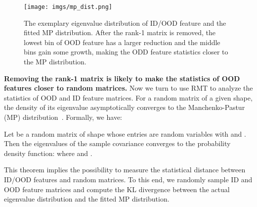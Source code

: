 \begin{figure}[htbp]
    \centering
    \texttt{[image: imgs/mp\_dist.png]}
    \caption{The exemplary eigenvalue distribution of ID/OOD feature and the fitted MP distribution. After the rank-1 matrix is removed, the lowest bin of OOD feature has a larger reduction and the middle bins gain some growth, making the ODD feature statistics closer to the MP distribution. }
    \label{fig:mp_dist}
\end{figure}

\noindent \textbf{Removing the rank-1 matrix is likely to make the statistics of OOD features closer to random matrices.} Now we turn to use RMT to analyze the statistics of OOD and ID feature matrices. For a random matrix of a given shape, the density of its eigenvalue asymptotically converges to the Manchenko-Pastur (MP) distribution~\cite{marvcenko1967distribution,sengupta1999distributions}. Formally, we have:
\begin{thm}
Let  be a random matrix of shape  whose entries are random variables with  and . Then the eigenvalues of the sample covariance  converges to the probability density function:  where  and .
\end{thm}

This theorem implies the possibility to measure the statistical distance between ID/OOD features and random matrices. To this end, we randomly sample  ID and OOD feature matrices and compute the KL divergence between the actual eigenvalue distribution and the fitted MP distribution.




\begin{table}[htbp]
    \caption{The KL divergence between ID/OOD feature and the fitted MP distribution. When the rank-1 feature is removed, the statistics of OOD matrix are closer to random matrices. }
    \centering
    \label{tab:mp_distance}
\end{table}

